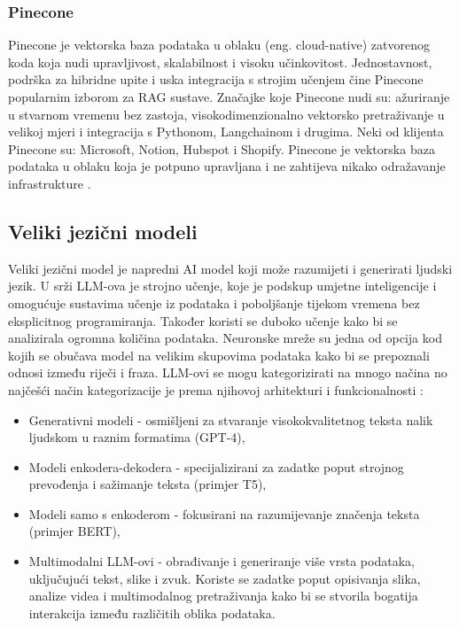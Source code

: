 \documentclass[]{foi}
\begin{document}
\subsubsection{Pinecone}
Pinecone je vektorska baza podataka u oblaku (eng. cloud-native) zatvorenog koda koja nudi upravljivost, skalabilnost i visoku učinkovitost. Jednostavnost, podrška za hibridne upite i uska integracija s strojim učenjem čine Pinecone 
popularnim izborom za RAG sustave. Značajke koje Pinecone nudi su: ažuriranje u stvarnom vremenu bez zastoja, visokodimenzionalno vektorsko pretraživanje u velikoj mjeri i integracija s Pythonom, Langchainom i drugima.
Neki od klijenta Pinecone su: Microsoft, Notion, Hubspot i Shopify.
Pinecone je vektorska baza podataka u oblaku koja je potpuno upravljana i ne zahtijeva nikako odražavanje infrastrukture \cite{baghel2025vectors}. 

\subsection{Veliki jezični modeli}
Veliki jezični model je napredni AI model koji može razumijeti i generirati ljudski jezik. U srži LLM-ova je strojno učenje, koje je podskup umjetne inteligencije i omogućuje 
sustavima učenje iz podataka i poboljšanje tijekom vremena bez eksplicitnog programiranja. Također koristi se duboko učenje kako bi se analizirala ogromna količina podataka. 
Neuronske mreže su jedna od opcija kod kojih se obučava model na velikim skupovima podataka kako bi se prepoznali odnosi između riječi i fraza.
LLM-ovi se mogu kategorizirati na mnogo načina no najčešći način kategorizacije je prema njihovoj arhitekturi i funkcionalnosti \cite{vermeir2025llm}:
\begin{itemize}
    \item Generativni modeli - osmišljeni za stvaranje visokokvalitetnog teksta nalik ljudskom u raznim formatima (GPT-4),
    \item Modeli enkodera-dekodera - specijalizirani za zadatke poput strojnog prevođenja i sažimanje teksta (primjer T5),
    \item Modeli samo s enkoderom - fokusirani na razumijevanje značenja teksta (primjer BERT),
    \item Multimodalni LLM-ovi - obrađivanje i generiranje više vrsta podataka, uključujući tekst, slike i zvuk. Koriste se zadatke poput 
    opisivanja slika, analize videa i multimodalnog pretraživanja kako bi se stvorila bogatija interakcija između različitih oblika
    podataka.
\end{itemize}
\end{document}
